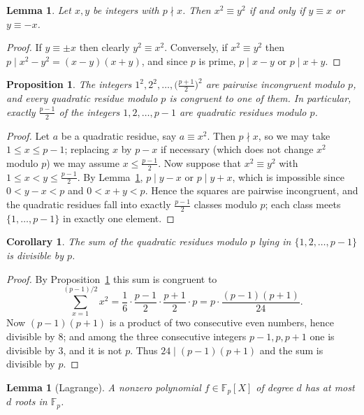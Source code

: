 \documentclass[11pt]{amsart}
\newtheorem{lemma}[theorem]{Lemma}
\newtheorem{proposition}[theorem]{Proposition}
\newtheorem{corollary}[theorem]{Corollary}
\theoremstyle{definition}
\theoremstyle{remark}
\begin{document}
\begin{lemma}\label{lem:pm}
Let $x,y$ be integers with $p\nmid x$. Then $x^2\equiv y^2$ if and only if
$y\equiv x$ or $y\equiv -x$.
\end{lemma}

\begin{proof}
If $y\equiv \pm x$ then clearly $y^2\equiv x^2$. Conversely, if
$x^2\equiv y^2$ then $p \mid x^2-y^2=(x-y)(x+y)$, and since $p$ is prime,
$p\mid x-y$ or $p\mid x+y$.
\end{proof}

\begin{proposition}\label{prop:count}
The integers $1^2, 2^2, \dots, \bigl(\tfrac{p+1}{2}\bigr)^2$ are pairwise
incongruent modulo $p$, and every quadratic residue modulo $p$ is congruent
to one of them. In particular, exactly $\frac{p-1}{2}$ of the integers
$1,2,\dots,p-1$ are quadratic residues modulo $p$.
\end{proposition}

\begin{proof}
Let $a$ be a quadratic residue, say $a\equiv x^2$. Then $p\nmid x$, so we may
take $1\le x\le p-1$; replacing $x$ by $p-x$ if necessary (which does not
change $x^2$ modulo $p$) we may assume $x\le \frac{p-1}{2}$. Now suppose that
$x^2\equiv y^2$ with $1\le x<y\le\frac{p-1}{2}$. By Lemma~\ref{lem:pm},
$p\mid y-x$ or $p\mid y+x$, which is impossible since $0<y-x<p$ and
$0<x+y<p$. Hence the squares are pairwise incongruent, and the quadratic
residues fall into exactly $\frac{p-1}{2}$ classes modulo $p$; each class
meets $\{1,\dots,p-1\}$ in exactly one element.
\end{proof}

\begin{corollary}\label{cor:sum}
The sum of the quadratic residues modulo $p$ lying in $\{1,2,\dots,p-1\}$ is
divisible by $p$.
\end{corollary}

\begin{proof}
By Proposition~\ref{prop:count} this sum is congruent to
\[
\sum_{x=1}^{(p-1)/2} x^2 = \frac{1}{6}\cdot\frac{p-1}{2}\cdot\frac{p+1}{2}\cdot p
 = p\cdot\frac{(p-1)(p+1)}{24}.
\]
Now $(p-1)(p+1)$ is a product of two consecutive even numbers, hence
divisible by $8$; and among the three consecutive integers $p-1,p,p+1$ one is
divisible by $3$, and it is not $p$. Thus $24\mid (p-1)(p+1)$ and the sum is
divisible by $p$.
\end{proof}

\begin{lemma}[Lagrange]\label{lem:lagrange}
A nonzero polynomial $f\in\mathbb{F}_p[X]$ of degree $d$ has at most $d$
roots in $\mathbb{F}_p$.
\end{lemma}
\end{document}
